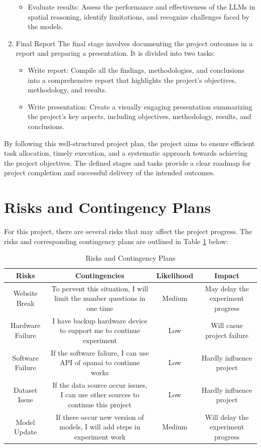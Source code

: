 \documentclass[journal,10pt]{IEEEtran}
\begin{document}
\begin{enumerate}
\begin{itemize}
        \item Evaluate results: Assess the performance and effectiveness of the LLMs in spatial reasoning, identify limitations, and recognize challenges faced by the models.
    \end{itemize}
    \item Final Report
    \subitem The final stage involves documenting the project outcomes in a report and preparing a presentation. It is divided into two tasks:
    \begin{itemize}
        \item Write report: Compile all the findings, methodologies, and conclusions into a comprehensive report that highlights the project's objectives, methodology, and results.
        \item Write presentation: Create a visually engaging presentation summarizing the project's key aspects, including objectives, methodology, results, and conclusions.
    \end{itemize}
\end{enumerate}

By following this well-structured project plan, the project aims to ensure efficient task allocation, timely execution, and a systematic approach towards achieving the project objectives. The defined stages and tasks provide a clear roadmap for project completion and successful delivery of the intended outcomes.

\section{Risks and Contingency Plans}
For this project, there are several risks that may affect the project progress. The risks and corresponding contingency plans are outlined in Table \ref{tab:risks} below:
\begin{table}[ht]
    \centering
    \caption{Risks and Contingency Plans}
    \begin{tabular}{@{}cccc@{}}
    \toprule
    Risks            & Contingencies                                                      & Likelihood & Impact                     \\ \midrule
Website Break & To pervent this situation, I will limit the number questions in one time          & Medium & May delay the experiment progress  \\
Hardware Failure & I have backup hardware device to support me to continue experiment & Low        & Will casue project failure \\
Software Failure & If the software faliure, I can use API of opanai to continue works & Low        & Hardly influence project   \\
Dataset Issue & If the data source occur issues, I can use other sources to continue this project & Low    & Hardly influence project           \\
Model Update  & If there occur new version of models, I will add steps in experiment work         & Medium & Will delay the experiment progress \\ \bottomrule
    \end{tabular}
    \label{tab:risks}
\end{table}




\end{document}
